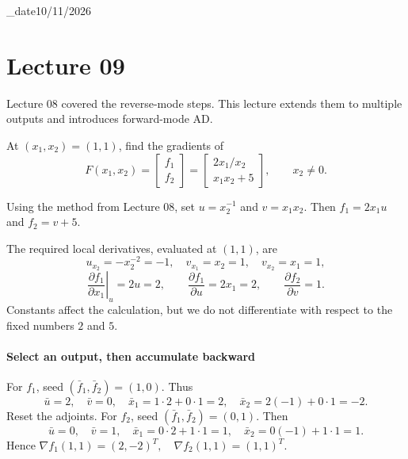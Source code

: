 \lecture_date{10/11/2026}
\chapter{Lecture 09}
Lecture 08 covered the reverse-mode steps. This lecture extends them to multiple outputs and introduces forward-mode AD.

\begin{example}
At $(x_1,x_2)=(1,1)$, find the gradients of
\[
 F(x_1,x_2)=\begin{bmatrix}f_1\\f_2\end{bmatrix}
 =\begin{bmatrix}2x_1/x_2\\x_1x_2+5\end{bmatrix},\qquad x_2\ne0.
\]
\end{example}
Using the method from Lecture 08, set $u=x_2^{-1}$ and $v=x_1x_2$. Then $f_1=2x_1u$ and $f_2=v+5$.
\begin{center}


\end{center}
The required local derivatives, evaluated at $(1,1)$, are
\[
 u_{x_2}=-x_2^{-2}=-1,\quad v_{x_1}=x_2=1,\quad v_{x_2}=x_1=1,
\]
\[
 \left.\frac{\partial f_1}{\partial x_1}\right|_u=2u=2,
 \qquad \frac{\partial f_1}{\partial u}=2x_1=2,
 \qquad \frac{\partial f_2}{\partial v}=1.
\]
Constants affect the calculation, but we do not differentiate with respect to the fixed numbers $2$ and $5$.

\subsubsection*{Select an output, then accumulate backward}
For $f_1$, seed $(\bar f_1,\bar f_2)=(1,0)$. Thus
\[
 \bar u=2,\quad \bar v=0,\quad
 \bar x_1=1\cdot2+0\cdot1=2,\quad
 \bar x_2=2(-1)+0\cdot1=-2.
\]
Reset the adjoints. For $f_2$, seed $(\bar f_1,\bar f_2)=(0,1)$. Then
\[
 \bar u=0,\quad \bar v=1,\quad
 \bar x_1=0\cdot2+1\cdot1=1,\quad
 \bar x_2=0(-1)+1\cdot1=1.
\]
Hence $\boxed{\nabla f_1(1,1)=(2,-2)^T,\quad\nabla f_2(1,1)=(1,1)^T.}$


